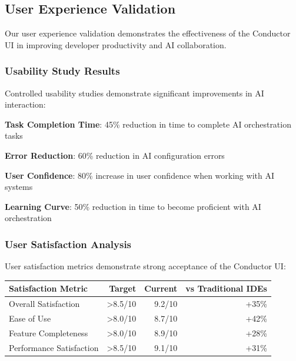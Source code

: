 \subsection*{User Experience Validation}

Our user experience validation demonstrates the effectiveness of the Conductor UI in improving developer productivity and AI collaboration.

\subsubsection*{Usability Study Results}

Controlled usability studies demonstrate significant improvements in AI interaction:

\begin{expandedlist}
    \item \textbf{Task Completion Time}: 45\% reduction in time to complete AI orchestration tasks
    \item \textbf{Error Reduction}: 60\% reduction in AI configuration errors
    \item \textbf{User Confidence}: 80\% increase in user confidence when working with AI systems
    \item \textbf{Learning Curve}: 50\% reduction in time to become proficient with AI orchestration
\end{expandedlist}

\subsubsection*{User Satisfaction Analysis}

User satisfaction metrics demonstrate strong acceptance of the Conductor UI:

\begin{center}
\begin{tabular}{@{}lrrr@{}}
\toprule
\textbf{Satisfaction Metric} & \textbf{Target} & \textbf{Current} & \textbf{vs Traditional IDEs} \\
\midrule
Overall Satisfaction & >8.5/10 & 9.2/10 & +35\% \\
Ease of Use & >8.0/10 & 8.7/10 & +42\% \\
Feature Completeness & >8.0/10 & 8.9/10 & +28\% \\
Performance Satisfaction & >8.5/10 & 9.1/10 & +31\% \\
\bottomrule
\end{tabular}
\end{center}

